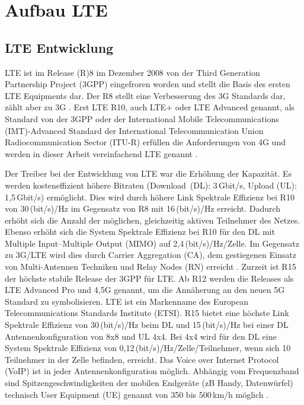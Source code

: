 
%
%
% 
% 
% 


\section{Aufbau LTE}
\label{sec:aufbau}
\subsection{LTE Entwicklung}
\label{subsec:LTE Entwicklung}
LTE ist im Release (R)8 im Dezember 2008 von der Third Generation Partnership Project (3GPP)  eingefroren worden und stellt die Basis des ersten LTE Equipments dar. Der R8 stellt eine Verbesserung des 3G Standards dar, zählt aber zu 3G \cite[S. 32ff]{Zoi09}. Erst LTE R10, auch LTE+ oder LTE Advanced genannt, als Standard von der 3GPP oder der International Mobile Telecommunications (IMT)-Advanced Standard der International Telecommunication Union Radiocommunication Sector (ITU-R) erfüllen die Anforderungen von 4G und werden in dieser Arbeit vereinfachend LTE genannt \cite{Wan13}.

Der Treiber bei der Entwicklung von LTE war die Erhöhung der Kapazität. Es werden kosteneffizient höhere Bitraten (Download~(DL): 3\,Gbit/s, Upload (UL): 1,5\,Gbit/s) ermöglicht. Dies wird durch höhere Link Spektrale Effizienz bei R10 von 30\,(bit/s)/Hz im Gegensatz von R8 mit 16\,(bit/s)/Hz erreicht. Dadurch erhöht sich die Anzahl der möglichen, gleichzeitig aktiven Teilnehmer des Netzes. Ebenso erhöht sich die System Spektrale Effizienz bei R10 für den DL mit Multiple Input–Multiple Output (MIMO) auf 2,4\,(bit/s)/Hz/Zelle. Im Gegensatz zu 3G/LTE wird dies durch Carrier Aggregation (CA), dem gestiegenen Einsatz von Multi-Antennen Techniken und Relay Nodes (RN) erreicht \cite{Wan13}. Zurzeit ist R15 der höchste stabile Release der 3GPP für LTE. Ab R12 werden die Releases als LTE Advanced Pro und 4,5G genannt, um die  Annäherung an den neuen 5G Standard zu symbolisieren. LTE ist ein Markenname des European Telecommunications Standards Institute (ETSI). R15 bietet eine höchste Link Spektrale Effizienz von 30\,(bit/s)/Hz beim DL und 15\,(bit/s)/Hz bei einer DL Antennenkonfiguration von 8x8 und UL 4x4. Bei 4x4 wird für den DL eine System Spektrale Effizienz von 0,12\,(bit/s)/Hz/Zelle/Teilnehmer, wenn sich 10 Teilnehmer in der Zelle befinden, erreicht. Das Voice over Internet Protocol (VoIP) ist in jeder Antennenkonfiguration möglich. Abhängig vom Frequenzband sind Spitzengeschwindigkeiten der mobilen Endgeräte (zB Handy, Datenwürfel) technisch User Equipment (UE) genannt von 350 bis 500\,km/h möglich \cite{GPP18}.
